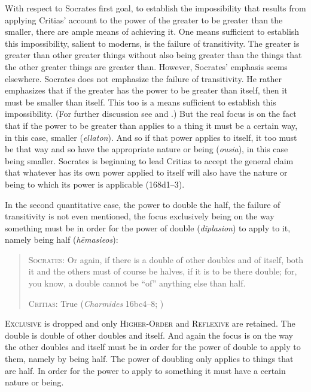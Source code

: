 With respect to Socrates first goal, to establish the impossibility that results from applying Critias' account to the power of the greater to be greater than the smaller, there are ample means of achieving it. One means sufficient to establish this impossibility, salient to moderns, is the failure of transitivity. The greater is greater than other greater things without also being greater than the things that the other greater things are greater than. However, Socrates' emphasis seems elsewhere. Socrates does not emphasize the failure of transitivity. He rather emphasizes that if the greater has the power to be greater than itself, then it must be smaller than itself. This too is a means sufficient to establish this impossibility. (For further discussion see \citealt[4 n9]{McCabe:2007ss} and \citealt[44–7]{Duncombe:2020gi}.) But the real focus is on the fact that if the power to be greater than applies to a thing it must be a certain way, in this case, smaller (\emph{ellaton}). And so if that power applies to itself, it too must be that way and so have the appropriate nature or being (\emph{ousia}), in this case being smaller. Socrates is beginning to lead Critias to accept the general claim that whatever has its own power applied to itself will also have the nature or being to which its power is applicable (168d1–3). 

In the second quantitative case, the power to double the half, the failure of transitivity is not even mentioned, the focus exclusively being on the way something must be in order for the power of double (\emph{diplasion}) to apply to it, namely being half (\emph{hēmasieos}):
\begin{quotation}
	\textsc{Socrates}: Or again, if there is a double of other doubles and of itself, both it and the others must of course be halves, if it is to be there double; for, you know, a double cannot be ``of'' anything else than half.
	
	\textsc{Critias}: True (\emph{Charmides} 16bc4–8; \citealt[61–3]{Lamb:1927qw})
\end{quotation}
\textsc{Exclusive} is dropped and only \textsc{Higher-Order} and \textsc{Reflexive} are retained. The double is double of other doubles and itself. And again the focus is on the way the other doubles and itself must be in order for the power of double to apply to them, namely by being half. The power of doubling only applies to things that are half. In order for the power to apply to something it must have a certain nature or being.

